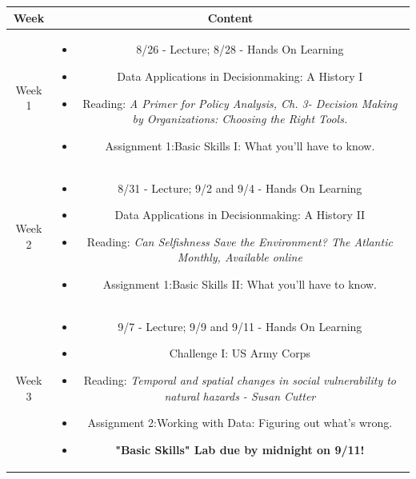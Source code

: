\documentclass[11pt]{article}
\begin{document}
\begin{table}[h!]
\small %
\begin{tabular}{ | c | c | }
\hline
\textbf{Week} & \textbf{Content} \\
\hline
Week 1 & \begin{minipage}{.85\textwidth}
\begin{itemize} \itemsep-0.4em
	\vspace{1mm}
	\item 8/26 - Lecture; 8/28 - Hands On Learning
	\item Data Applications in  Decisionmaking: A History I  \item Reading: \textit{A Primer for Policy Analysis, Ch. 3- Decision Making by  Organizations: Choosing the Right Tools.}
	\item Assignment 1:Basic Skills I: What you’ll have to know. 
	\vspace{1mm}
\end{itemize}
\end{minipage} \\
\hline

Week 2 & \begin{minipage}{.85\textwidth}
\begin{itemize} \itemsep-0.4em
	\vspace{1mm}
	\item 8/31 - Lecture; 9/2 and 9/4 - Hands On Learning
	\item Data Applications in  Decisionmaking: A History II  \item Reading: \textit{Can Selfishness Save the Environment?  The Atlantic Monthly, Available online}
	\item Assignment 1:Basic Skills II: What you’ll have to know. 
	\vspace{1mm}
\end{itemize}
\end{minipage} \\
\hline

Week 3 & \begin{minipage}{.85\textwidth}
\begin{itemize} \itemsep-0.4em
	\vspace{1mm}
	\item 9/7 - Lecture; 9/9 and 9/11 - Hands On Learning
	\item Challenge I: US Army Corps  \item Reading: \textit{Temporal and spatial changes in social vulnerability to natural hazards - Susan Cutter}
	\item Assignment 2:Working with Data: Figuring out what’s wrong.
	\item \textbf{"Basic Skills" Lab due by midnight on 9/11!}
	\vspace{1mm}
\end{itemize}
\end{minipage} \\
\hline


\end{tabular}
\end{table}
\end{document}
